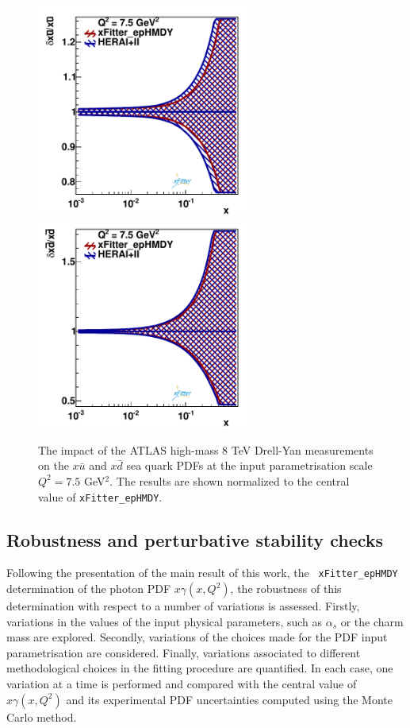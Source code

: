 \begin{figure}[t]
\centering
\includegraphics[width=7cm]{figs/q2_7_5_pdf_ubar_ratio.pdf}
\includegraphics[width=7cm]{figs/q2_7_5_pdf_dbar_ratio.pdf} 
\caption{The impact of the ATLAS high-mass 8 TeV Drell-Yan measurements
  on the $x\bar{u}$ and $x\bar{d}$ sea quark PDFs at the input
  parametrisation scale $Q^2=7.5$ GeV$^2$.
  The results are shown normalized to the central value of {\tt xFitter\_epHMDY}. 
  }
\label{fig:QCDfit}
\end{figure}

\subsection{Robustness and perturbative stability checks}
\label{sec:crosschecks}

Following the presentation of the main result of this work, the {\tt
  xFitter\_epHMDY} determination of the
photon PDF $x\gamma(x,Q^2)$, the robustness of this determination
with respect to a number of variations is assessed.
%
Firstly, variations in the values of the input
physical parameters, such as $\alpha_s$ or the charm mass are explored.
%
Secondly, variations of the choices made for the PDF input parametrisation
are considered.
%
Finally,
variations associated to different methodological choices in
the fitting procedure are quantified.
%
In each case, one variation at a time is performed 
and compared with the central value
of $x\gamma(x,Q^2)$ and its experimental PDF
uncertainties computed using the Monte Carlo method.

